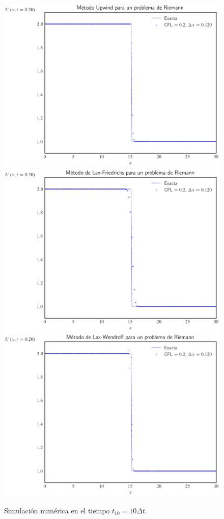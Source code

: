 \begin{figure}[ht!]
	\centering
	\includegraphics[width=.30\paperwidth]{../snapshots/upwindheaviside1d-10.png}
	\includegraphics[width=.30\paperwidth]{../snapshots/lax-friedrichsheaviside1d-10.png}
	\includegraphics[width=.30\paperwidth]{../snapshots/lax-wendroffheaviside1d-10.png}
	\caption{Simulación numérica en el tiempo $t_{10}=10\Delta t$.}
	\label{fig:example2t10}
\end{figure}


